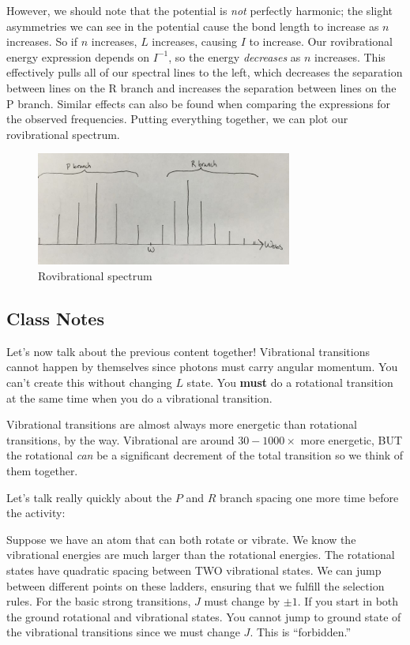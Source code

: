 \documentclass{article}
\begin{document}
However, we should note that the potential is {\it not} perfectly harmonic; the slight asymmetries we can see in the potential cause the bond length to increase as $n$ increases. So if $n$ increases, $L$ increases, causing $I$ to increase. Our rovibrational energy expression depends on $I^{-1}$, so the energy {\it decreases} as $n$ increases. This effectively pulls all of our spectral lines to the left, which decreases the separation between lines on the R branch and increases the separation between lines on the P branch. Similar effects can also be found when comparing the expressions for the observed frequencies. Putting everything together, we can plot our rovibrational spectrum.

\begin{figure}[ht]
    \centering
    \includegraphics[width=0.75\textwidth]{figures/800px-Spectrum.jpg}
    \caption{Rovibrational spectrum}
    \label{fig:rovooooospec}
\end{figure}


\subsection{Class Notes}

Let's now talk about the previous content together! Vibrational transitions cannot happen by themselves since photons must carry angular momentum. You can't create this without changing $L$ state. You \textbf{must} do a rotational transition at the same time when you do a vibrational transition. 

Vibrational transitions are almost always more energetic than rotational transitions, by the way. Vibrational are around $30-1000\times$ more energetic, BUT the rotational \textit{can} be a significant decrement of the total transition  so we think of them together. 

Let's talk really quickly about the $P$ and $R$ branch spacing one more time before the activity:

Suppose we have an atom that can both rotate or vibrate. We know the vibrational energies are much larger than the rotational energies. The rotational states have quadratic spacing between TWO vibrational states. We can jump between different points on these ladders, ensuring that we fulfill the selection rules. For the basic strong transitions, $J$ must change by $\pm 1$. If you start in both the ground rotational and vibrational states. You cannot jump to ground state of the vibrational transitions since we must change $J$. This is ``forbidden.'' 
\end{document}
